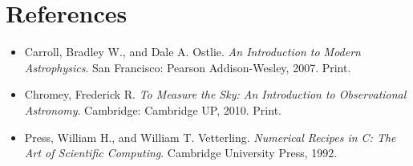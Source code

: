 \documentclass[authoryear, 12pt,5p, times]{elsarticle}
\begin{document}
 \section*{References}
 \begin{footnotesize}
 \begin{itemize}
 \item Carroll, Bradley W., and Dale A. Ostlie. \textit{An Introduction to Modern Astrophysics}. San Francisco: Pearson Addison-Wesley, 2007. Print.
\item Chromey, Frederick R. \textit{To Measure the Sky: An Introduction to Observational Astronomy}. Cambridge: Cambridge UP, 2010. Print.
\item Press, William H., and William T. Vetterling. \textit{Numerical Recipes in C: The Art of Scientific Computing}. Cambridge University Press, 1992.  
\end{itemize}
% 
%
  \end{footnotesize}
\end{document}
